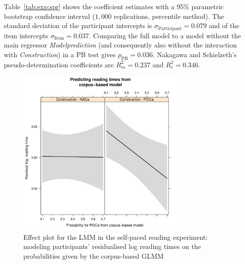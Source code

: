 \documentclass[USenglish]{article}
\newcommand{\mpPB}{\ensuremath{p_{\text{PB}}}}
\begin{document}
Table~\ref{tab:exp:spr} shows the coefficient estimates with a 95\% parametric bootstrap confidence interval ($1,000$ replications, percentile method).
The standard deviation of the participant intercepts is $\sigma_{\text{Participant}}=0.079$ and of the item intercepts $\sigma_{\text{Item}}=0.037$.
Comparing the full model to a model without the main regressor \textit{Modelprediction} (and consequently also without the interaction with \textit{Construction}) in a PB test gives $\mpPB=0.036$.
Nakagawa and Schielzeth's pseudo-determination coefficients are $R^2_m=0.237$ and $R^2_c=0.346$.

\begin{figure}[h]
\centering
\includegraphics[width=0.75\textwidth]{../R/output/spr_effects}
\caption{Effect plot for the LMM in the self-paced reading experiment: modeling participants' residualised log reading times on the probabilities given by the corpus-based GLMM}
\label{fig:spr:effects}
\end{figure}
\end{document}
